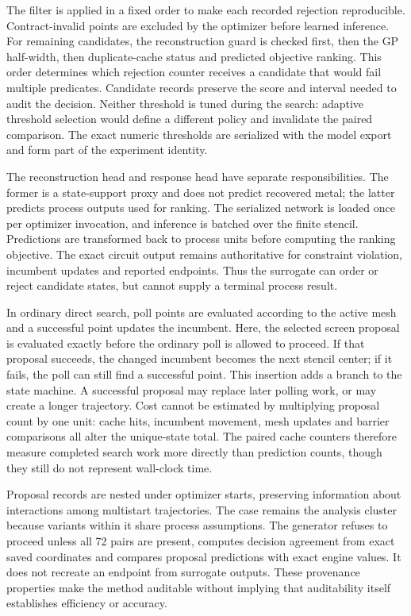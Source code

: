 \documentclass[10pt]{article}
\begin{document}
The filter is applied in a fixed order to make each recorded rejection reproducible. Contract-invalid points are excluded by the optimizer before learned inference. For remaining candidates, the reconstruction guard is checked first, then the GP half-width, then duplicate-cache status and predicted objective ranking. This order determines which rejection counter receives a candidate that would fail multiple predicates. Candidate records preserve the score and interval needed to audit the decision. Neither threshold is tuned during the search: adaptive threshold selection would define a different policy and invalidate the paired comparison. The exact numeric thresholds are serialized with the model export and form part of the experiment identity.

The reconstruction head and response head have separate responsibilities. The former is a state-support proxy and does not predict recovered metal; the latter predicts process outputs used for ranking. The serialized network is loaded once per optimizer invocation, and inference is batched over the finite stencil. Predictions are transformed back to process units before computing the ranking objective. The exact circuit output remains authoritative for constraint violation, incumbent updates and reported endpoints. Thus the surrogate can order or reject candidate states, but cannot supply a terminal process result.

In ordinary direct search, poll points are evaluated according to the active mesh and a successful point updates the incumbent. Here, the selected screen proposal is evaluated exactly before the ordinary poll is allowed to proceed. If that proposal succeeds, the changed incumbent becomes the next stencil center; if it fails, the poll can still find a successful point. This insertion adds a branch to the state machine. A successful proposal may replace later polling work, or may create a longer trajectory. Cost cannot be estimated by multiplying proposal count by one unit: cache hits, incumbent movement, mesh updates and barrier comparisons all alter the unique-state total. The paired cache counters therefore measure completed search work more directly than prediction counts, though they still do not represent wall-clock time.

Proposal records are nested under optimizer starts, preserving information about interactions among multistart trajectories. The case remains the analysis cluster because variants within it share process assumptions. The generator refuses to proceed unless all 72 pairs are present, computes decision agreement from exact saved coordinates and compares proposal predictions with exact engine values. It does not recreate an endpoint from surrogate outputs. These provenance properties make the method auditable without implying that auditability itself establishes efficiency or accuracy.
\end{document}
